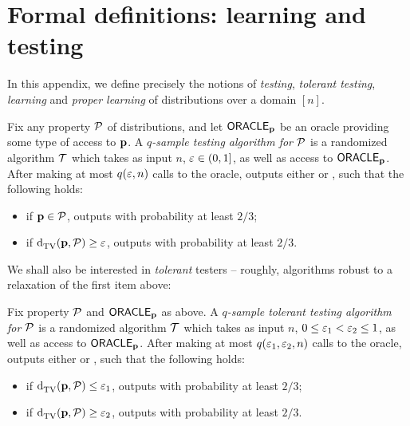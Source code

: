 \section{Formal definitions: learning and testing}\label{appendix:definitions}
In this appendix, we define precisely the notions of \emph{testing}, \emph{tolerant testing}, \emph{learning} and \emph{proper learning} of distributions over a domain $[n]$.
\begin{definition}[Testing]\label{def:testing:alg}
  Fix any property $\mathcal{P}$ of distributions, and let ${\sf ORACLE}_{\mathbf{p}}$ be an oracle providing some type of access to $\mathbf{p}$. A \emph{$q$-sample testing algorithm for $\mathcal{P}$} is a randomized algorithm $\mathcal{T}$ which takes as input $n$, $\varepsilon\in(0,1]$, as well as access to ${\sf ORACLE}_{\mathbf{p}}$. After making at most $q(\varepsilon,n)$ calls to the oracle, \Tester outputs either \accept or \reject, such that the following holds:
  \begin{itemize}
    \item if $\mathbf{p}\in\mathcal{P}$, \Tester outputs \accept with probability at least $2/3$;
    \item if ${\operatorname{d}_{\textrm{TV}}^{}\!\left({\mathbf{p}, \mathcal{P}}\right)} \geq \varepsilon$, \Tester outputs \reject with probability at least $2/3$.
  \end{itemize}
\end{definition}
\noindent We shall also be interested in \emph{tolerant} testers -- {roughly}, algorithms robust to a relaxation of the first item above:
\begin{definition}\label{def:tol:testing:alg}
  Fix property $\mathcal{P}$ and ${\sf ORACLE}_{\mathbf{p}}$ as above. A \emph{$q$-sample tolerant testing algorithm for $\mathcal{P}$} is a randomized algorithm $\mathcal{T}$ which takes as input $n$, $0 \leq \varepsilon_1 < \varepsilon_2 \leq 1$, as well as access to ${\sf ORACLE}_{\mathbf{p}}$. After making at most $q(\varepsilon_1,\varepsilon_2,n)$ calls to the oracle, \Tester outputs either \accept or \reject, such that the following holds:
  \begin{itemize}
    \item if ${\operatorname{d}_{\textrm{TV}}^{}\!\left({\mathbf{p}, \mathcal{P}}\right)} \leq \varepsilon_1$, \Tester outputs \accept with probability at least $2/3$;
    \item if ${\operatorname{d}_{\textrm{TV}}^{}\!\left({\mathbf{p}, \mathcal{P}}\right)} \geq \varepsilon_2$, \Tester outputs \reject with probability at least $2/3$.
  \end{itemize}
\end{definition}

